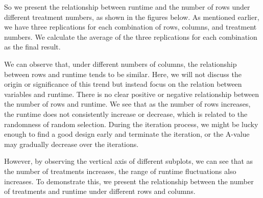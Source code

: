 \documentclass[
  a4paper,
  oneside,
  openany,
  12pt,
  onecolumn]{book}
\theoremstyle{plain}
\theoremstyle{definition}
\theoremstyle{remark}
\begin{document}
So we present the relationship between runtime and the number of rows
under different treatment numbers, as shown in the figures below. As
mentioned earlier, we have three replications for each combination of
rows, columns, and treatment numbers. We calculate the average of the
three replications for each combination as the final result.

\begin{figure}


\caption{\label{fig-align}}

\end{figure}%

We can observe that, under different numbers of columns, the
relationship between rows and runtime tends to be similar. Here, we will
not discuss the origin or significance of this trend but instead focus
on the relation between variables and runtime. There is no clear
positive or negative relationship between the number of rows and
runtime. We see that as the number of rows increases, the runtime does
not consistently increase or decrease, which is related to the
randomness of random selection. During the iteration process, we might
be lucky enough to find a good design early and terminate the iteration,
or the A-value may gradually decrease over the iterations.

However, by observing the vertical axis of different subplots, we can
see that as the number of treatments increases, the range of runtime
fluctuations also increases. To demonstrate this, we present the
relationship between the number of treatments and runtime under
different rows and columns.
\end{document}
